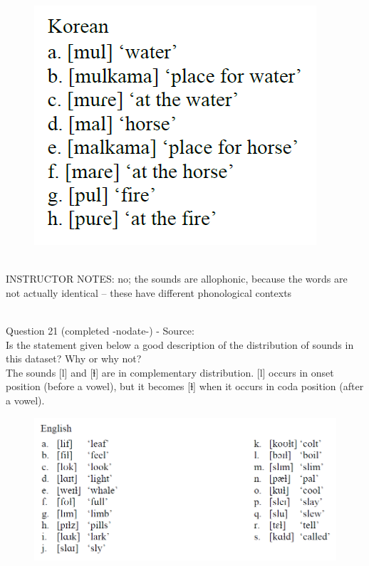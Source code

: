\documentclass[12pt]{article}
\begin{document}
\begin{figure}[H]
\includegraphics{../images/korean.png}
\end{figure}

~\\
INSTRUCTOR NOTES: no; the sounds are allophonic, because the words are not actually identical -- these have different phonological contexts


~\\

{\large Question 21} (completed -nodate-) - Source: \\

Is the statement given below a good description of the distribution of sounds in this dataset? Why or why not?\\

The sounds {[l]} and {[ɫ]} are in complementary distribution. {[l]} occurs in onset position (before a vowel), but it becomes {[ɫ]} when it occurs in coda position (after a vowel).

\begin{figure}[H]
\includegraphics{../images/english_laterals.png}
\end{figure}
\end{document}
